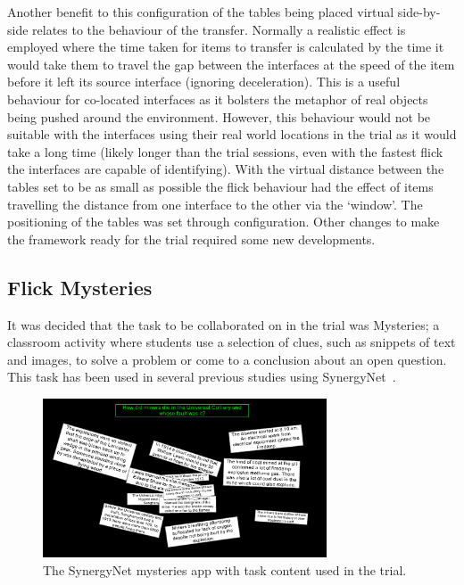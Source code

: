 \documentclass[a4paper,11pt]{article}
\begin{document}
Another benefit to this configuration of the tables being placed virtual side-by-side relates to the behaviour of the transfer.
Normally a realistic effect is employed where the time taken for items to transfer is calculated by the time it would take them to travel the gap between the interfaces at the speed of the item before it left its source interface (ignoring deceleration).
This is a useful behaviour for co-located interfaces as it bolsters the metaphor of real objects being pushed around the environment.
However, this behaviour would not be suitable with the interfaces using their real world locations in the trial as it would take a long time (likely longer than the trial sessions, even with the fastest flick the interfaces are capable of identifying).
With the virtual distance between the tables set to be as small as possible the flick behaviour had the effect of items travelling the distance from one interface to the other via the `window'.
The positioning of the tables was set through configuration.
Other changes to make the framework ready for the trial required some new developments.

\subsection{Flick Mysteries}

It was decided that the task to be collaborated on in the trial was Mysteries; a classroom activity where students use a selection of clues, such as snippets of text and images, to solve a problem or come to a conclusion about an open question.
This task has been used in several previous studies using SynergyNet~\cite{mercier:2013,mercier:2014,mercier:2015}.

\begin{figure}[h]
 \centering
   \includegraphics[width=0.75\textwidth]{figures/flickmysteryexample.png}
   \caption{The SynergyNet mysteries app with task content used in the trial.}
   \label{fig:FlickMysteryExample}
\end{figure}
\end{document}

